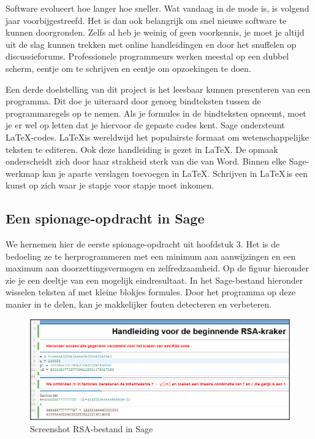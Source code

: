 Software evolueert hoe langer hoe sneller. Wat vandaag in de mode is, is volgend jaar voorbijgestreefd. Het is dan ook belangrijk om snel nieuwe software te kunnen doorgronden. Zelfs al heb je weinig of geen voorkennis, je moet je altijd uit de slag kunnen trekken met online handleidingen en door het snuffelen op discussieforums. Professionele programmeurs werken meestal op een dubbel scherm, eentje om te schrijven en eentje om opzoekingen te doen.

Een derde doelstelling van dit project is het leesbaar kunnen presenteren van een programma. Dit doe je uiteraard door genoeg bindteksten tussen de programmaregels op te nemen. Als je formules in de bindteksten opneemt, moet je er wel op letten dat je hiervoor de gepaste codes kent. Sage ondersteunt \LaTeX-codes. \LaTeX is wereldwijd het populairste formaat om wetenschappelijke teksten te editeren. Ook deze handleiding is gezet in \LaTeX. De opmaak onderscheidt zich door haar strakheid sterk van die van Word. Binnen elke Sage-werkmap kan je aparte verslagen toevoegen in \LaTeX. Schrijven in \LaTeX \,is een kunst op zich waar je stapje voor stapje moet inkomen.

\subsection{Een spionage-opdracht in Sage}

We hernemen hier de eerste spionage-opdracht uit hoofdstuk 3. Het is de bedoeling ze te herprogrammeren met een minimum aan aanwijzingen en een maximum aan doorzettingsvermogen en zelfredzaamheid. Op de figuur hieronder zie je een deeltje van een mogelijk  eindresultaat. In het Sage-bestand hieronder wisselen teksten af met kleine blokjes formules. Door het programma op deze manier in te delen, kan je makkelijker fouten detecteren en verbeteren.

\begin{figure} [h]
\label{sagescreenshot}
\centering
\includegraphics[width=1.3\textwidth]{Sage.jpg}
\caption{Screenshot RSA-bestand in Sage}
\end{figure}

